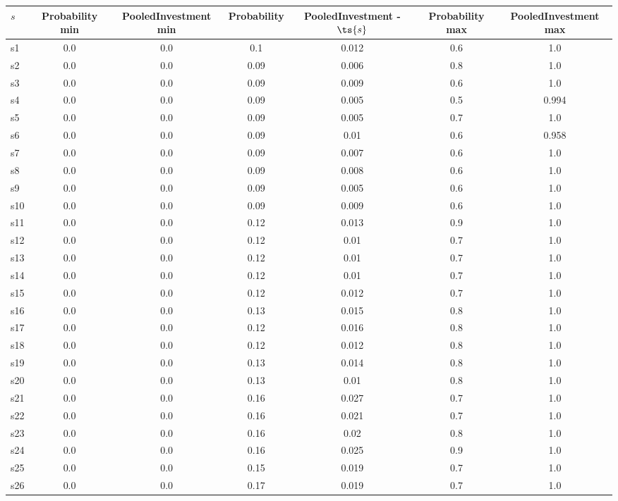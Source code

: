 \documentclass{article}
\begin{document}
\noindent\begin{tabular}{|l|c|c|c|c|c|c|}
\hline
$s$& Probability min & PooledInvestment min & Probability & PooledInvestment - $\ts{s}$ & Probability max & PooledInvestment max\\
\hline
s1 &0.0 & 0.0 & 0.1 & 0.012 & 0.6 & 1.0\\
\hline
s2 &0.0 & 0.0 & 0.09 & 0.006 & 0.8 & 1.0\\
\hline
s3 &0.0 & 0.0 & 0.09 & 0.009 & 0.6 & 1.0\\
\hline
s4 &0.0 & 0.0 & 0.09 & 0.005 & 0.5 & 0.994\\
\hline
s5 &0.0 & 0.0 & 0.09 & 0.005 & 0.7 & 1.0\\
\hline
s6 &0.0 & 0.0 & 0.09 & 0.01 & 0.6 & 0.958\\
\hline
s7 &0.0 & 0.0 & 0.09 & 0.007 & 0.6 & 1.0\\
\hline
s8 &0.0 & 0.0 & 0.09 & 0.008 & 0.6 & 1.0\\
\hline
s9 &0.0 & 0.0 & 0.09 & 0.005 & 0.6 & 1.0\\
\hline
s10 &0.0 & 0.0 & 0.09 & 0.009 & 0.6 & 1.0\\
\hline
s11 &0.0 & 0.0 & 0.12 & 0.013 & 0.9 & 1.0\\
\hline
s12 &0.0 & 0.0 & 0.12 & 0.01 & 0.7 & 1.0\\
\hline
s13 &0.0 & 0.0 & 0.12 & 0.01 & 0.7 & 1.0\\
\hline
s14 &0.0 & 0.0 & 0.12 & 0.01 & 0.7 & 1.0\\
\hline
s15 &0.0 & 0.0 & 0.12 & 0.012 & 0.7 & 1.0\\
\hline
s16 &0.0 & 0.0 & 0.13 & 0.015 & 0.8 & 1.0\\
\hline
s17 &0.0 & 0.0 & 0.12 & 0.016 & 0.8 & 1.0\\
\hline
s18 &0.0 & 0.0 & 0.12 & 0.012 & 0.8 & 1.0\\
\hline
s19 &0.0 & 0.0 & 0.13 & 0.014 & 0.8 & 1.0\\
\hline
s20 &0.0 & 0.0 & 0.13 & 0.01 & 0.8 & 1.0\\
\hline
s21 &0.0 & 0.0 & 0.16 & 0.027 & 0.7 & 1.0\\
\hline
s22 &0.0 & 0.0 & 0.16 & 0.021 & 0.7 & 1.0\\
\hline
s23 &0.0 & 0.0 & 0.16 & 0.02 & 0.8 & 1.0\\
\hline
s24 &0.0 & 0.0 & 0.16 & 0.025 & 0.9 & 1.0\\
\hline
s25 &0.0 & 0.0 & 0.15 & 0.019 & 0.7 & 1.0\\
\hline
s26 &0.0 & 0.0 & 0.17 & 0.019 & 0.7 & 1.0\\

\end{tabular}
\end{document}
